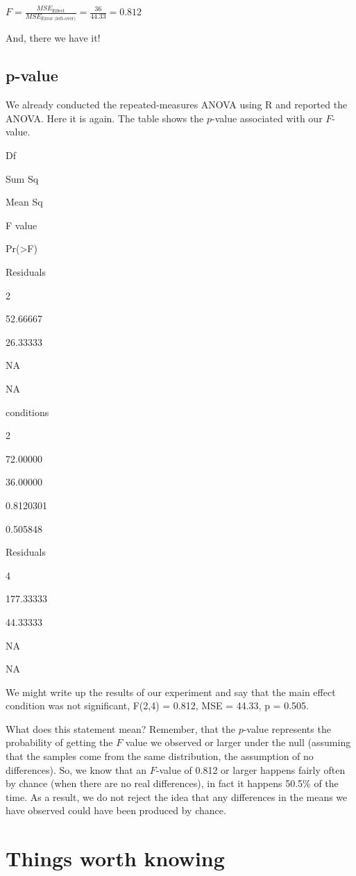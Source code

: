 \documentclass[]{book}
\begin{document}
\(F = \frac{MSE_\text{Effect}}{MSE_\text{Error (left-over)}} = \frac{36}{44.33}= 0.812\)

And, there we have it!

\hypertarget{p-value}{%
\subsection{p-value}\label{p-value}}

We already conducted the repeated-measures ANOVA using R and reported the ANOVA. Here it is again. The table shows the \(p\)-value associated with our \(F\)-value.

Df

Sum Sq

Mean Sq

F value

Pr(\textgreater{}F)

Residuals

2

52.66667

26.33333

NA

NA

conditions

2

72.00000

36.00000

0.8120301

0.505848

Residuals

4

177.33333

44.33333

NA

NA

We might write up the results of our experiment and say that the main effect condition was not significant, F(2,4) = 0.812, MSE = 44.33, p = 0.505.

What does this statement mean? Remember, that the \(p\)-value represents the probability of getting the \(F\) value we observed or larger under the null (assuming that the samples come from the same distribution, the assumption of no differences). So, we know that an \(F\)-value of 0.812 or larger happens fairly often by chance (when there are no real differences), in fact it happens 50.5\% of the time. As a result, we do not reject the idea that any differences in the means we have observed could have been produced by chance.

\hypertarget{things-worth-knowing}{%
\section{Things worth knowing}\label{things-worth-knowing}}
\end{document}
